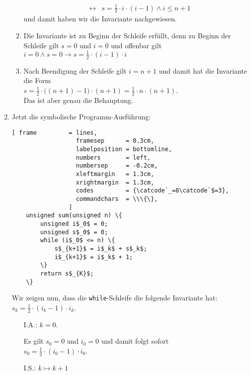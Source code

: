 \documentclass{article}
\renewcommand{\labelenumii}{\arabic{enumii}.}
\begin{document}
\begin{enumerate}
\begin{enumerate}
\begin{eqnarray*}
      & \leftrightarrow & s = \frac{1}{2} \cdot i \cdot (i-1) \wedge i \leq n + 1                         
      \end{eqnarray*}
      und damit haben wir die Invariante nachgewiesen.
\item Die Invariante ist zu Beginn der Schleife erf\"ullt, denn zu Beginn der
      Schleife gilt $s = 0$ und $i = 0$ und offenbar gilt
      \\[0.2cm]
      \hspace*{1.3cm}
      $i = 0 \wedge s = 0 \rightarrow s = \frac{1}{2} \cdot (i-1) \cdot i$
\item Nach Beendigung der Schleife gilt $i = n + 1$ und damit hat die Invariante die Form
      \\[0.2cm]
      \hspace*{1.3cm}
      $s = \frac{1}{2} \cdot \bigl((n+1)-1\bigl) \cdot (n+1) = \frac{1}{2} \cdot n \cdot (n+1)$.
      \\[0.2cm]
      Das ist aber genau die Behauptung.
\end{enumerate}
\item Jetzt die symbolische Programm-Ausf\"uhrung:
      \begin{Verbatim}[ frame         = lines, 
                  framesep      = 0.3cm, 
                  labelposition = bottomline,
                  numbers       = left,
                  numbersep     = -0.2cm,
                  xleftmargin   = 1.3cm,
                  xrightmargin  = 1.3cm,
                  codes         = {\catcode`_=8\catcode`$=3},
                  commandchars  = \\\{\},
                ]
    unsigned sum(unsigned n) \{
        unsigned i$_0$ = 0;
        unsigned s$_0$ = 0;
        while (i$_0$ <= n) \{
            s$_{k+1}$ = i$_k$ + s$_k$;
            i$_{k+1}$ = i$_k$ + 1;
        \}
        return s$_{K}$;
    \}
    \end{Verbatim} 
      Wir zeigen nun, dass die \texttt{while}-Schleife die folgende Invariante hat: 
      \\[0.2cm]
      \hspace*{1.3cm}
      $s_k = \frac{1}{2} \cdot (i_{k}-1) \cdot i_k$.
      \renewcommand{\labelenumii}{\arabic{enumii}.}
      \begin{enumerate}
      \item[I.A.:] $k=0$.

            Es gilt $s_0 = 0$ und $i_0 = 0$ und damit folgt sofort
            \\[0.2cm]
            \hspace*{1.3cm} $s_0 = \frac{1}{2} \cdot (i_{0}-1) \cdot i_0$.
      \item[I.S.:] $k \mapsto k+1$ 


\end{enumerate}
\end{enumerate}
\end{document}
